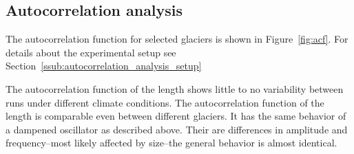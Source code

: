 


    \subsection{Autocorrelation analysis} %
    \label{sub:autocorrelation_analysis_results}

      The autocorrelation function for selected glaciers is shown in Figure~\ref{fig:acf}. For details about the experimental setup see Section~\ref{ssub:autocorrelation_analysis_setup}

      The autocorrelation function of the \vas{} length shows little to no variability between runs under different climate conditions. %
      The autocorrelation function of the \vas{} length is comparable even between different glaciers. It has the same behavior of a dampened oscillator as described above. Their are differences in amplitude and frequency--most likely affected by size--the general behavior is almost identical. 
      
